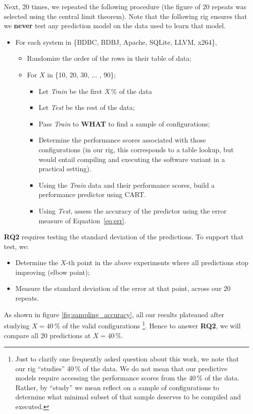 \documentclass{sig-alternative}
\newcommand{\bi}{\begin{itemize}}%
\newcommand{\ei}{\end{itemize}}
\newcommand{\eq}[1]{Equation~\ref{eq:#1}}
\newcommand{\what}{{\bf WHAT }}
\begin{document}
Next, 20 times, we repeated the following procedure (the figure of 20 repeats was
selected using the central limit theorem). Note that the following rig ensures that
we \textbf{never} test any prediction model on the data used to learn that model.
\bi
\item For each system in \{BDBC, BDBJ, Apache, SQLite, LLVM, x264\},
\bi
\item Randomize the order of the rows in their table of data;
\item For $X$ in \{10, 20, 30, ... , 90\};
\bi
\item Let {\em Train} be the first $X$\,\% of the data 
\item Let {\em Test} be the rest of the data;
\item Pass {\em Train} to \what to find a sample of configurations;
\item Determine the performance scores associated with those configurations (in our rig, this corresponds to a table lookup, but would entail compiling and executing the software variant in a practical setting).
\item Using the {\em Train}  data and their performance scores, build a performance predictor using CART.
\item Using {\em Test}, assess the accuracy of the predictor using the error 
measure of \eq{err}.
\ei
\ei
\ei
{\bf RQ2} requires testing the standard deviation of the predictions. To support that test, we:
\bi
\item Determine the $X$-th point in the above experiments where all predictions stop improving (elbow point);
\item Measure the standard deviation of the error at that point, across our 20 repeats.
\ei
As shown in figure \ref{fig:sampling_accuracy}, all our results plateaued after studying $X=40$\,\% of the valid configurations
 \footnote{Just to clarify one frequently asked question about this work, we note
that our rig ``studies'' 40\,\% of the data. We do not mean that our predictive models
 require accessing the performance scores from the 40\,\% of the data. Rather, by ``study'' we mean   reflect 
 on a sample of configurations to determine what minimal subset of that
sample deserves to be compiled and executed.}.
 Hence to answer {\bf RQ2}, we will compare all 20 predictions at $X=40$\,\%.
 
\end{document}
